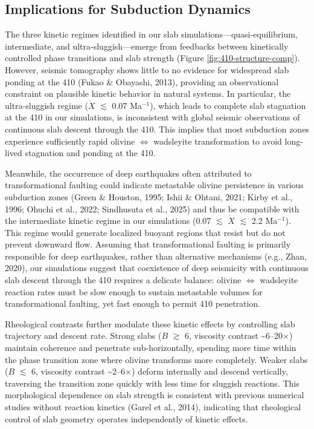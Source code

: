 \documentclass[draft,linenumbers]{agujournal2019}
\begin{document}
\subsection{Implications for Subduction
Dynamics}\label{sec:implications-for-subduction-dynamics}

The three kinetic regimes identified in our slab
simulations---quasi-equilibrium, intermediate, and
ultra-sluggish---emerge from feedbacks between kinetically controlled
phase transitions and slab strength (Figure
\ref{fig:410-structure-comp}). However, seismic tomography shows little
to no evidence for widespread slab ponding at the 410 (Fukao \&
Obayashi, 2013), providing an observational constraint on plausible
kinetic behavior in natural systems. In particular, the ultra-sluggish
regime (\(\dot{X}\) \(\lesssim\) 0.07 Ma\(^{-1}\)), which leads to
complete slab stagnation at the 410 in our simulations, is inconsistent
with global seismic observations of continuous slab descent through the
410. This implies that most subduction zones experience sufficiently
rapid olivine \(\Leftrightarrow\) wadsleyite transformation to avoid
long-lived stagnation and ponding at the 410.

Meanwhile, the occurrence of deep earthquakes often attributed to
transformational faulting could indicate metastable olivine persistence
in various subduction zones (Green \& Houston, 1995; Ishii \& Ohtani,
2021; Kirby et al., 1996; Ohuchi et al., 2022; Sindhusuta et al., 2025)
and thus be compatible with the intermediate kinetic regime in our
simulations (0.07 \(\lesssim\) \(\dot{X}\) \(\lesssim\) 2.2
Ma\(^{-1}\)). This regime would generate localized buoyant regions that
resist but do not prevent downward flow. Assuming that transformational
faulting is primarily responsible for deep earthquakes, rather than
alternative mechanisms (e.g., Zhan, 2020), our simulations suggest that
coexistence of deep seismicity with continuous slab descent through the
410 requires a delicate balance: olivine \(\Leftrightarrow\) wadsleyite
reaction rates must be slow enough to sustain metastable volumes for
transformational faulting, yet fast enough to permit 410 penetration.

Rheological contrasts further modulate these kinetic effects by
controlling slab trajectory and descent rate. Strong slabs (\(B\)
\(\gtrsim\) 6, viscosity contrast \textasciitilde6--20\(\times\))
maintain coherence and penetrate sub-horizontally, spending more time
within the phase transition zone where olivine transforms more
completely. Weaker slabs (\(B\) \(\lesssim\) 6, viscosity contrast
\textasciitilde2--6\(\times\)) deform internally and descend vertically,
traversing the transition zone quickly with less time for sluggish
reactions. This morphological dependence on slab strength is consistent
with previous numerical studies without reaction kinetics (Garel et al.,
2014), indicating that rheological control of slab geometry operates
independently of kinetic effects.
\end{document}

